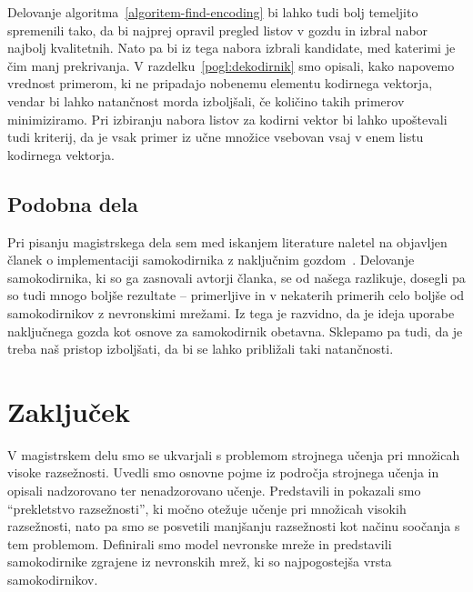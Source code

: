 \documentclass[12pt,a4paper,twoside]{article}
\theoremstyle{definition} %
\theoremstyle{plain} %
\numberwithin{equation}{section}  %
\begin{document}
Delovanje algoritma~\ref{algoritem-find-encoding} bi lahko tudi bolj temeljito spremenili tako, da bi najprej opravil pregled listov v gozdu in izbral nabor najbolj kvalitetnih.
Nato pa bi iz tega nabora izbrali kandidate, med katerimi je čim manj prekrivanja. %
V razdelku~\ref{pogl:dekodirnik} smo opisali, kako napovemo vrednost primerom, ki ne pripadajo nobenemu elementu kodirnega vektorja, vendar bi lahko natančnost morda izboljšali, če količino takih primerov minimiziramo.
Pri izbiranju nabora listov za kodirni vektor bi lahko upoštevali tudi kriterij, da je vsak primer iz učne množice vsebovan vsaj v enem listu kodirnega vektorja.

\subsection{Podobna dela}

Pri pisanju magistrskega dela sem med iskanjem literature naletel na objavljen članek o implementaciji samokodirnika z naključnim gozdom~\cite{feng2018autoencoder}.
Delovanje samokodirnika, ki so ga zasnovali avtorji članka, se od našega razlikuje, dosegli pa so tudi mnogo boljše rezultate -- primerljive in v nekaterih primerih celo boljše od samokodirnikov z nevronskimi mrežami.
Iz tega je razvidno, da je ideja uporabe naključnega gozda kot osnove za samokodirnik obetavna.
Sklepamo pa tudi, da je treba naš pristop izboljšati, da bi se lahko približali taki natančnosti.


\section{Zaključek}  

V magistrskem delu smo se ukvarjali s problemom strojnega učenja pri množicah visoke razsežnosti.
Uvedli smo osnovne pojme iz področja strojnega učenja in opisali nadzorovano ter nenadzorovano učenje.
Predstavili in pokazali smo ``prekletstvo razsežnosti'', ki močno otežuje učenje pri množicah visokih razsežnosti, nato pa smo se posvetili manjšanju razsežnosti kot načinu soočanja s tem problemom.
Definirali smo model nevronske mreže in predstavili samokodirnike zgrajene iz nevronskih mrež, ki so najpogostejša vrsta samokodirnikov.
\end{document}
